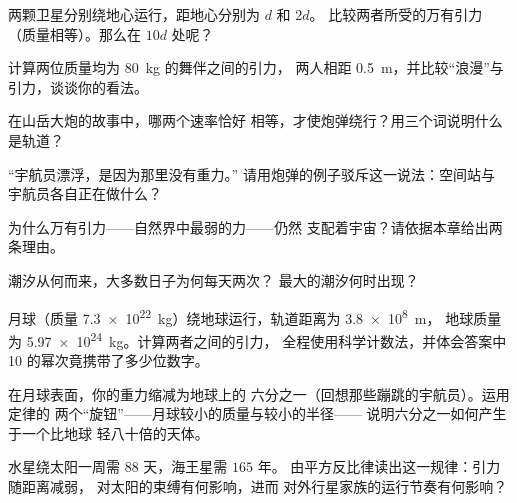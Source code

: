 \begin{exercise}[$\star$]\label{exo:g9:gravitation:3}
两颗卫星分别绕地心运行，距地心分别为 $d$ 和 $2d$。
比较两者所受的万有引力
（质量相等）。那么在 $10 d$ 处呢？
\end{exercise}

\begin{exercise}[$\star$]\label{exo:g9:gravitation:4}
计算两位质量均为 \qty{80}{kg} 的舞伴之间的引力，
两人相距 \qty{0.5}{m}，并比较“浪漫”与
引力，谈谈你的看法。
\end{exercise}

\begin{exercise}[$\star$]\label{exo:g9:gravitation:5}
在山岳大炮的故事中，哪两个速率恰好
相等，才使炮弹绕行？用三个词说明什么是轨道？
\end{exercise}

\begin{exercise}[$\star$]\label{exo:g9:gravitation:6}
“宇航员漂浮，是因为那里没有重力。”
请用炮弹的例子驳斥这一说法：空间站与
宇航员各自正在做什么？
\end{exercise}

\begin{exercise}[$\star$]\label{exo:g9:gravitation:7}
为什么万有引力——自然界中最弱的力——仍然
支配着宇宙？请依据本章给出两条理由。
\end{exercise}

\begin{exercise}[$\star$]\label{exo:g9:gravitation:8}
潮汐从何而来，大多数日子为何每天两次？
最大的潮汐何时出现？
\end{exercise}

\begin{exercise}[$\star\star$]\label{exo:g9:gravitation:9}
月球（质量 \qty{7.3e22}{kg}）绕地球运行，轨道距离为 \qty{3.8e8}{m}，
地球质量为 \qty{5.97e24}{kg}。计算两者之间的引力，
全程使用科学计数法，并体会答案中
10 的幂次竟携带了多少位数字。
\end{exercise}

\begin{exercise}[$\star\star$]\label{exo:g9:gravitation:10}
在月球表面，你的重力缩减为地球上的
六分之一（回想那些蹦跳的宇航员）。运用定律的
两个“旋钮”——月球较小的质量与较小的半径——
说明六分之一如何产生于一个比地球
轻八十倍的天体。
\end{exercise}

\begin{exercise}[$\star\star$]\label{exo:g9:gravitation:11}
水星绕太阳一周需 $88$ 天，海王星需 $165$ 年。
由平方反比律读出这一规律：引力随距离减弱，
对太阳的束缚有何影响，进而
对外行星家族的运行节奏有何影响？
\end{exercise}

